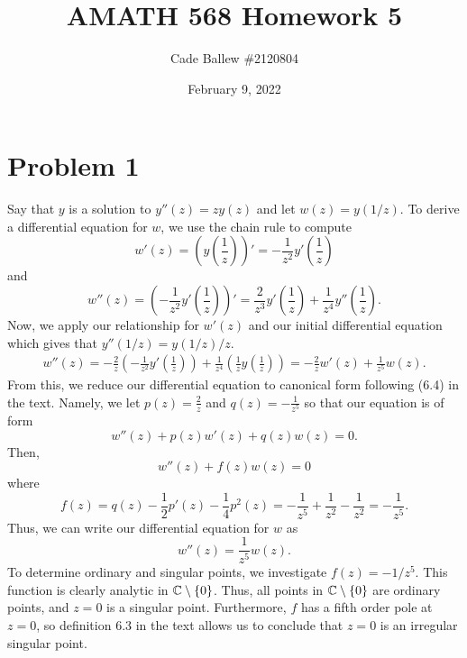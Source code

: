 \documentclass{article}
\title{AMATH 568 Homework 5}
\author{Cade Ballew \#2120804}
\date{February 9, 2022}
\begin{document}
	
\maketitle
	
\section{Problem 1}
Say that $y$ is a solution to $y''(z) = zy(z)$ and let $w(z) = y(1/z)$. To derive a differential equation for $w$, we use the chain rule to compute 
\[
w'(z)=\left(y\left(\frac{1}{z}\right)\right)'=-\frac{1}{z^{2}}y'\left(\frac{1}{z}\right)
\]
and
\[
w''(z)=\left(-\frac{1}{z^{2}}y'\left(\frac{1}{z}\right)\right)'=\frac{2}{z^3}y'\left(\frac{1}{z}\right)+\frac{1}{z^4}y''\left(\frac{1}{z}\right).
\]
Now, we apply our relationship for $w'(z)$ and our initial differential equation which gives that $y''(1/z)=y(1/z)/z$.
\begin{align*}
w''(z)=-\frac{2}{z}\left(-\frac{1}{z^{2}}y'\left(\frac{1}{z}\right)\right)+\frac{1}{z^4}\left(\frac{1}{z}y\left(\frac{1}{z}\right)\right)=-\frac{2}{z}w'(z)+\frac{1}{z^5}w(z).
\end{align*}
From this, we reduce our differential equation to canonical form following (6.4) in the text. Namely, we let $p(z)=\frac{2}{z}$ and $q(z)=-\frac{1}{z^5}$ so that our equation is of form
\[
w''(z)+p(z)w'(z)+q(z)w(z)=0.
\]
Then,
\[
w''(z)+f(z)w(z)=0
\]
where
\[
f(z)=q(z)-\frac{1}{2}p'(z)-\frac{1}{4}p^2(z)=-\frac{1}{z^5}+\frac{1}{z^2}-\frac{1}{z^2}=-\frac{1}{z^5}.
\]
Thus, we can write our differential equation for $w$ as
\[
w''(z)=\frac{1}{z^5}w(z).
\]
To determine ordinary and singular points, we investigate $f(z)=-1/z^5$. This function is clearly analytic in $\mathbb{C}\setminus\{0\}$. Thus, all points in $\mathbb{C}\setminus\{0\}$ are ordinary points, and $z=0$ is a singular point. Furthermore, $f$ has a fifth order pole at $z=0$, so definition 6.3 in the text allows us to conclude that $z=0$ is an irregular singular point. 
\end{document}
